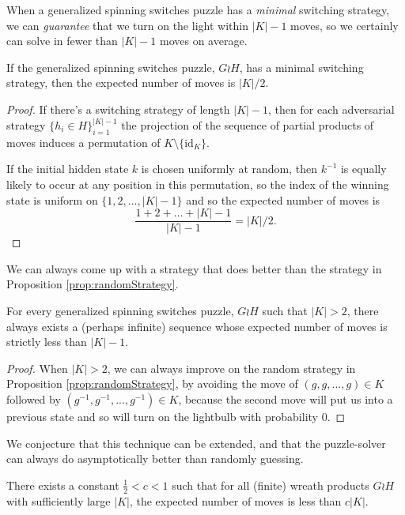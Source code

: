 When a generalized spinning switches puzzle has a \textit{minimal} switching
strategy, we can \textit{guarantee} that we turn on the light within $|K|-1$
moves, so we certainly can solve in fewer than $|K|-1$ moves on average.

\begin{proposition}
If the generalized spinning switches puzzle, $G \wr H$, has a minimal switching
strategy, then the expected number of moves is $|K|/2$.
\end{proposition}
\begin{proof}
  If there's a switching strategy of length $|K| - 1$,
  then for each adversarial strategy $\{h_i \in H\}_{i=1}^{|K| - 1}$
  the projection of the sequence of partial products of moves induces
  a permutation of $K \setminus \{\mathrm{id}_K\}$.

  If the initial hidden state $k$ is chosen uniformly at random, then
  $k^{-1}$ is equally likely to occur at any position in this permutation,
  so the index of the winning state is uniform on
  ${\{1, 2, \dots, |K| - 1\}}$ and so the expected number of moves is \begin{equation}
    \frac{1 + 2 + \dots + |K| - 1}{|K| - 1} = |K|/2.
  \end{equation}
\end{proof}

We can always come up with a strategy that does better than the strategy in
Proposition \ref{prop:randomStrategy}.

\begin{proposition}
  For every generalized spinning switches puzzle, $G \wr H$ such that
  $|K| > 2$, there always exists a (perhaps infinite) sequence
  whose expected number of moves is strictly less than $|K| - 1$.
\end{proposition}
\begin{proof}
  When $|K| > 2$, we can always improve on the random strategy in
  Proposition \ref{prop:randomStrategy}, by avoiding the move of
  $(g,g, ..., g) \in K$ followed by $(g^{-1},g^{-1}, ..., g^{-1}) \in K$,
  because the second move will put us into a previous state and so will
  turn on the lightbulb with probability $0$.
\end{proof}

We conjecture that this technique can be extended, and that the puzzle-solver
can always do asymptotically better than randomly guessing.

\begin{conjecture}
  There exists a constant $\frac{1}{2} < c < 1$ such that for all
  (finite) wreath products $G \wr H$ with sufficiently large $|K|$,
  the expected number of moves is less than $c|K|$.
\end{conjecture}

